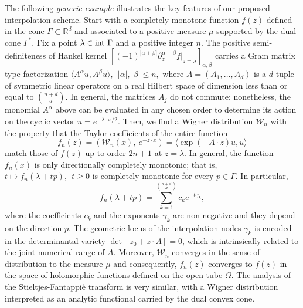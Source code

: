 \documentclass[11pt,reqno]{amsart}
\theoremstyle{plain}
\theoremstyle{definition}
\numberwithin{equation}{section}
\begin{document}
The following {\it generic example} illustrates the key features of our proposed interpolation scheme. Start with a completely monotone function $f(z)$ defined in the cone
$\Gamma \subset {\mathbb R}^d$ and associated to a positive measure $\mu$ supported by the dual cone $\Gamma^\ast$. Fix a point $\lambda \in {\rm int} \ \Gamma$ and a positive integer $n$.
The positive semi-definiteness of Hankel kernel  $[(-1)^{|\alpha + \beta|} \partial_z^{\alpha + \beta} f|_{z=\lambda}]_{\alpha, \beta}$ carries a Gram matrix type factorization $\langle A^\alpha u, A^\beta u\rangle, \ \ |\alpha|, |\beta| \leq n,$ where $A = (A_1, \ldots, A_d)$ is a $d$-tuple of symmetric linear operators on a real Hilbert space of dimension less than or equal to
$\binom{n+d}{d}$. In general, the matrices $A_j$ do not commute; nonetheless, the monomial $A^\alpha$ above can be evaluated in any chosen order to determine its action on the cyclic vector $u=e^{-\lambda \cdot x/2}$. Then, we find a Wigner distribution $\mathcal{W}_n$ with the property that the Taylor coefficients of the entire function
$$ f_n(z) = (\mathcal{W}_n(x), \ e^{-z\cdot x}) = \langle \exp ( - A\cdot z) u, u \rangle$$
match those of $f(z)$ up to order $2n+1$ at $z=\lambda$.
In general, the function $f_n(x)$ is only directionally completely monotonic; that is, $t \mapsto f_n(\lambda + t p), \ \ t \geq 0$ is completely monotonic for every $p \in \Gamma$. In particular,
$$ f_n(\lambda + t p) = \sum_{k=1}^{\binom{n+d}{d}} c_k e^{-t \gamma_k},$$
where the coefficients $c_k$ and the exponents $\gamma_k$ are non-negative and they depend on the direction $p$. The geometric locus of the interpolation nodes $\gamma_k$ is encoded in the determinantal variety $\det [z_0 + z\cdot A] = 0$, which is intrinsically related to the joint numerical range of $A$.
Moreover, $\mathcal{W}_n$ converges in the sense of distribution to the measure $\mu$ and consequently, $f_n(z)$ converges to $f(z)$ in the space of holomorphic functions defined on the open tube $\Omega$. The analysis of the Stieltjes-Fantappi{\`e} transform is very similar, with a Wigner distribution interpreted as an analytic functional carried by the dual convex cone.
\end{document}
